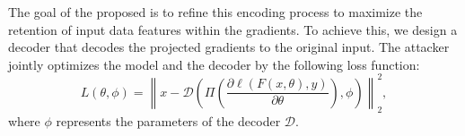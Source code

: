 The goal of the proposed \name is to refine this encoding process to maximize the retention of input data features within the gradients. 
To achieve this, we design a decoder that decodes the projected gradients to the original input. 
The attacker jointly optimizes the model and the decoder by the following loss function:
\begin{equation} \label{eq:decoder}
    L(\theta, \phi) = \left\|x - \mathcal{D}\left(\Pi\left(\frac{\partial \ell(F(x, \theta), y)}{\partial \theta}\right), \phi\right) \right\|_2^2,
\end{equation}
where $\phi$ represents the parameters of the decoder $\mathcal{D}$.


